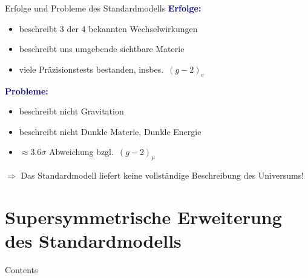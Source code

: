 \documentclass[hyperref={pdfpagelabels=false},ngerman]{beamer}
\renewcommand{\emph}[1]{\textbf{\textcolor{darkblue}{#1}}}
\begin{document}
\begin{frame}{Erfolge und Probleme des Standardmodells}
  \emph{Erfolge:}
  \begin{itemize}
  \item beschreibt 3 der 4 bekannten Wechselwirkungen
  \item beschreibt uns umgebende sichtbare Materie
  \item viele Präzisionstests bestanden, insbes.\ $(g-2)_e$
  \end{itemize}
  \vspace*{1em}
  \emph{Probleme:}
  \begin{itemize}
  \item beschreibt nicht Gravitation
  \item beschreibt nicht Dunkle Materie, Dunkle Energie
  \item $\approx 3.6\sigma$ Abweichung bzgl.\ $(g-2)_\mu$
  \end{itemize}
  \vspace*{1em}
  $\Rightarrow$ Das Standardmodell liefert keine vollständige Beschreibung
  des Universums!
\end{frame}


\section{Supersymmetrische Erweiterung des Standardmodells}

\begin{frame}{Contents}
\end{frame}


\end{document}
